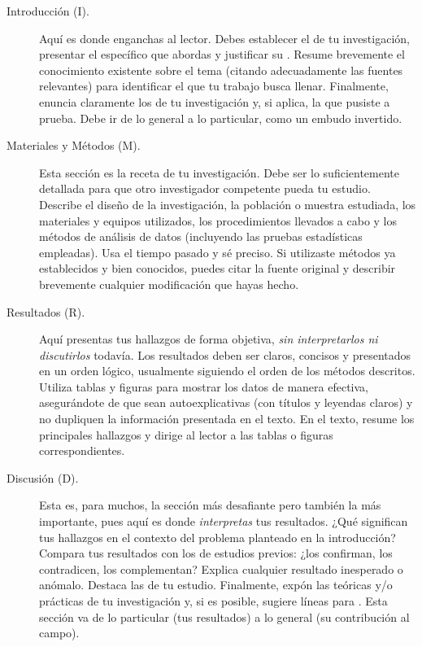 \begin{description}
  \item[Introducción (I).] Aquí es donde enganchas al lector.
        Debes establecer el  de tu investigación,
        presentar el  específico que abordas y justificar
        su .
        Resume brevemente el conocimiento existente sobre el tema (citando
        adecuadamente las fuentes relevantes) para identificar el  que tu trabajo busca llenar.
        Finalmente, enuncia claramente los  de tu
        investigación y, si aplica, la  que pusiste a
        prueba.
        Debe ir de lo general a lo particular, como un embudo invertido.

  \item[Materiales y Métodos (M).] Esta sección es la receta de tu
        investigación.
        Debe ser lo suficientemente detallada para que otro investigador
        competente pueda  tu estudio.
        Describe el diseño de la investigación, la población o muestra estudiada,
        los materiales y equipos utilizados, los procedimientos llevados a cabo
        y los métodos de análisis de datos (incluyendo las pruebas estadísticas
        empleadas).
        Usa el tiempo pasado y sé preciso.
        Si utilizaste métodos ya establecidos y bien conocidos, puedes citar la
        fuente original y describir brevemente cualquier modificación que hayas
        hecho.

  \item[Resultados (R).] Aquí presentas tus hallazgos de forma objetiva,
        \emph{sin interpretarlos ni discutirlos} todavía.
        Los resultados deben ser claros, concisos y presentados en un orden
        lógico, usualmente siguiendo el orden de los métodos descritos.
        Utiliza tablas y figuras para mostrar los datos de manera efectiva,
        asegurándote de que sean autoexplicativas (con títulos y leyendas
        claros) y no dupliquen la información presentada en el texto.
        En el texto, resume los principales hallazgos y dirige al lector a las
        tablas o figuras correspondientes.

  \item[Discusión (D).] Esta es, para muchos, la sección más desafiante pero
        también la más importante, pues aquí es donde \emph{interpretas} tus
        resultados.
        ¿Qué significan tus hallazgos en el contexto del problema planteado en la
        introducción?
        Compara tus resultados con los de estudios previos: ¿los confirman, los
        contradicen, los complementan?
        Explica cualquier resultado inesperado o anómalo.
        Destaca las  de tu estudio.
        Finalmente, expón las  teóricas y/o prácticas
        de tu investigación y, si es posible, sugiere líneas para
        .
        Esta sección va de lo particular (tus resultados) a lo general (su
        contribución al campo).


\end{description}
